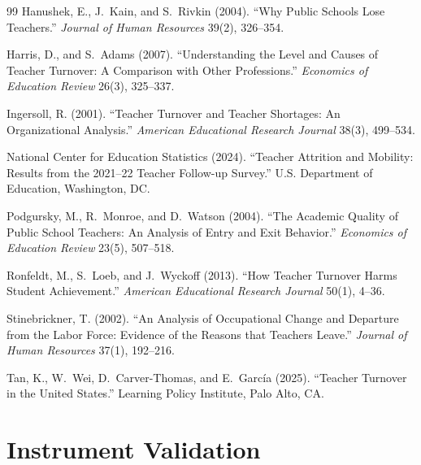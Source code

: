 \documentclass[11pt,a4paper]{article}
\begin{document}
\begin{thebibliography}{99}
Hanushek, E., J.~Kain, and S.~Rivkin (2004).
``Why Public Schools Lose Teachers.''
\emph{Journal of Human Resources} 39(2), 326--354.

Harris, D., and S.~Adams (2007).
``Understanding the Level and Causes of Teacher Turnover: A Comparison
with Other Professions.''
\emph{Economics of Education Review} 26(3), 325--337.

Ingersoll, R. (2001).
``Teacher Turnover and Teacher Shortages: An Organizational Analysis.''
\emph{American Educational Research Journal} 38(3), 499--534.

National Center for Education Statistics (2024).
``Teacher Attrition and Mobility: Results from the 2021--22 Teacher
Follow-up Survey.'' U.S. Department of Education, Washington, DC.

Podgursky, M., R.~Monroe, and D.~Watson (2004).
``The Academic Quality of Public School Teachers: An Analysis of Entry
and Exit Behavior.''
\emph{Economics of Education Review} 23(5), 507--518.

Ronfeldt, M., S.~Loeb, and J.~Wyckoff (2013).
``How Teacher Turnover Harms Student Achievement.''
\emph{American Educational Research Journal} 50(1), 4--36.

Stinebrickner, T. (2002).
``An Analysis of Occupational Change and Departure from the Labor
Force: Evidence of the Reasons that Teachers Leave.''
\emph{Journal of Human Resources} 37(1), 192--216.

Tan, K., W.~Wei, D.~Carver-Thomas, and E.~García (2025).
``Teacher Turnover in the United States.''
Learning Policy Institute, Palo Alto, CA.

\end{thebibliography}

\clearpage
\appendix

\section{Instrument Validation}\label{app:instrument}
\end{document}
